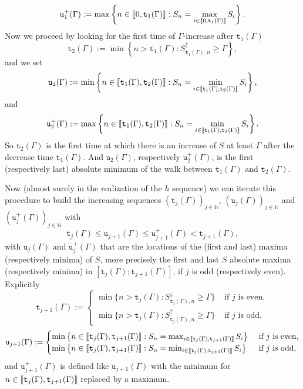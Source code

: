 \documentclass[AHL,Unicode,longabstracts,published]{cedram}
\newcommand{\bbN}{\mathbb{N}}
\newcommand{\gG}{\Gamma}
\renewcommand*\ss{\mathtt{u}}
\newcommand{\ttt}{\mathtt{t}}
\newcommand{\tu}{\ss}
\newcommand{\tuplus}{\ss^+}
\newcommand{\llbracket}{\mathopen{[\mkern -2.7mu[}}
\newcommand{\rrbracket}{\mathclose{]\mkern -2.7mu]}}
\newcommand{\lbra}{\llbracket}
\newcommand{\rbra}{\rrbracket}
\begin{document}
\begin{equation}\label{eq:completenotation2.1}
\tuplus_1(\gG):= \max\left\{ n \in \lbra 0, \ttt_1(\gG)\rbra: S_n= \max_{i\in \lbra 0, \ttt_1(\gG)\rbra} S_i\right\}.
\end{equation}
Now we proceed by looking for the first time of $\gG$-increase after $ \ttt_1(\gG)$
\begin{equation}
\ttt_2(\gG):= \min\left\{n> \ttt_1(\gG): S^\uparrow_{\ttt_1(\gG),n} \ge \gG\right\},
\end{equation}
and we set
\begin{equation}
\tu_2(\gG) := \min\left\{n\in \lbra \ttt_1(\gG), \ttt_2(\gG)\rbra:S_n= \min_{i \in \lbra \ttt_1(\gG), \ttt_2(\gG)\rbra} S_i\right\},
\end{equation}
and
\begin{equation}
\tuplus_2(\gG) := \max\left\{n \in \lbra \ttt_1(\gG), \ttt_2(\gG)\rbra: S_n= \min_{i \in \lbra \ttt_1(\gG), \ttt_2(\gG)\rbra} S_i\right\}.
\end{equation}
So $\ttt_2(\gG)$ is the first time at which there is an increase of $S$ at least $\gG$ after the decrease time $\ttt_1(\gG)$. And $ \tu_2(\gG)$, respectively $\tuplus_2(\gG)$, is the first (respectively last) absolute minimum of the walk between $\ttt_1(\gG)$ and $\ttt_2(\gG)$.

Now (almost surely in the realization of the $h$ sequence) we can iterate this procedure to build the increasing sequences $(\ttt_j(\gG))_{j \in \bbN}$, $(\tu_j(\gG))_{j \in \bbN}$ and $(\tuplus_j(\gG))_{j \in \bbN}$ with
\begin{equation}
\ttt_j(\gG)  \le \tu_{j+1}(\gG) \le \tuplus_{j+1}(\gG) <  \ttt_{j+1}(\gG),
\end{equation}
with $\tu_j(\gG)$ and $ \tuplus_j(\gG)$ that are the locations of the (first and last) maxima (respectively minima) of $S$, more precisely the first and last $S$ absolute maxima (respectively minima) in $[\ttt_j(\gG); \ttt_{j+1}(\gG)]$, if $j$ is odd (respectively even). Explicitly
\begin{equation}
\ttt_{j+1}(\gG):=
\begin{cases}
\min\bigl\{n> \ttt_j(\gG): S^\downarrow_{\ttt_j(\gG),n} \ge \gG\bigr\} & \text{ if $j$ is even},
\\[0.2em]
\min\big\{n> \ttt_j(\gG): S^\uparrow_{\ttt_j(\gG),n} \ge \gG\big\} & \text{ if $j$ is odd},
\end{cases}
\end{equation}
\begin{equation}\label{eq:new-u}
\tu_{j+1}(\gG):=
\begin{cases}
\min\left\{n \in \lbra \ttt_j(\gG), \ttt_{j+1}(\gG)\rbra: S_n= \max_{i \in \lbra \ttt_j(\gG), \ttt_{j+1}(\gG)\rbra} S_i\right\} & \text{ if $j$ is even},
\\
\min\left\{n \in \lbra \ttt_j(\gG), \ttt_{j+1}(\gG)\rbra: S_n= \min_{i \in \lbra \ttt_j(\gG), \ttt_{j+1}(\gG)\rbra} S_i\right\} & \text{ if $j$ is odd},
\end{cases}
\end{equation}
and $\tu_{j+1}^+(\gG)$ is defined like $\tu_{j+1}(\gG)$ with the minimum for $n \in \lbra \ttt_j(\gG), \ttt_{j+1}(\gG)\rbra$ replaced by a maximum.
\end{document}
